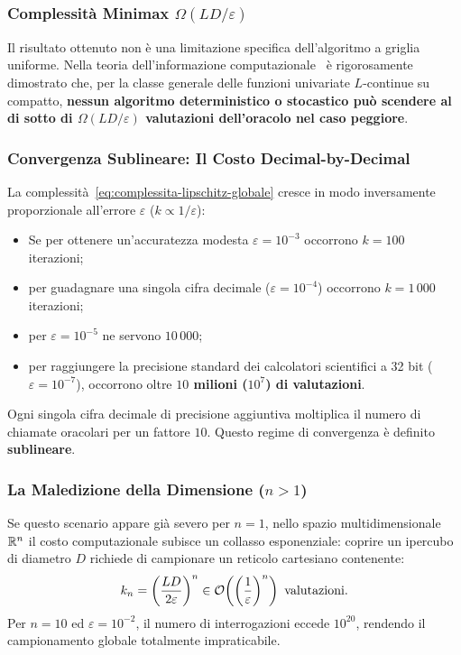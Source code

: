 \subsubsection{Complessit\`a Minimax $\Omega(LD/\varepsilon)$}
Il risultato ottenuto non \`e una limitazione specifica dell'algoritmo a griglia uniforme. Nella teoria dell'informazione computazionale~\cite{nesterov2004introductory} \`e rigorosamente dimostrato che, per la classe generale delle funzioni univariate $L$-continue su compatto, \textbf{nessun algoritmo deterministico o stocastico pu\`o scendere al di sotto di $\Omega(LD/\varepsilon)$ valutazioni dell'oracolo nel caso peggiore}.

\subsubsection{Convergenza Sublineare: Il Costo Decimal-by-Decimal}
La complessit\`a~\eqref{eq:complessita-lipschitz-globale} cresce in modo inversamente proporzionale all'errore $\varepsilon$ ($k \propto 1/\varepsilon$):
\begin{itemize}
    \item Se per ottenere un'accuratezza modesta $\varepsilon = 10^{-3}$ occorrono $k = 100$ iterazioni;
    \item per guadagnare una singola cifra decimale ($\varepsilon = 10^{-4}$) occorrono $k = 1\,000$ iterazioni;
    \item per $\varepsilon = 10^{-5}$ ne servono $10\,000$;
    \item per raggiungere la precisione standard dei calcolatori scientifici a 32 bit ($\varepsilon = 10^{-7}$), occorrono oltre \textbf{$10$ milioni ($10^7$) di valutazioni}.
\end{itemize}
Ogni singola cifra decimale di precisione aggiuntiva moltiplica il numero di chiamate oracolari per un fattore $10$. Questo regime di convergenza \`e definito \textbf{sublineare}.

\subsubsection{La Maledizione della Dimensione ($n > 1$)}
Se questo scenario appare gi\`a severo per $n = 1$, nello spazio multidimensionale $\mathbb{R}^n$ il costo computazionale subisce un collasso esponenziale: coprire un ipercubo di diametro $D$ richiede di campionare un reticolo cartesiano contenente:
\begin{equation}
    k_n = \left( \frac{LD}{2\varepsilon} \right)^n \in \mathcal{O}\!\left(\left(\frac{1}{\varepsilon}\right)^n\right) \text{ valutazioni}.
\end{equation}
Per $n = 10$ ed $\varepsilon = 10^{-2}$, il numero di interrogazioni eccede $10^{20}$, rendendo il campionamento globale totalmente impraticabile.

